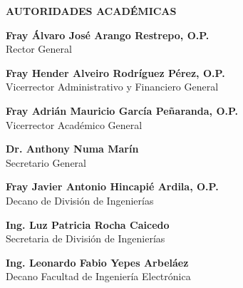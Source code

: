 \newpage
\clearpage
\thispagestyle{empty}

\begin{center}
	{\bfseries\MakeUppercase{AUTORIDADES ACADÉMICAS}}
\end{center}

\vspace{1.5cm} 

\begin{flushright}
	\textbf{Fray Álvaro José Arango Restrepo, O.P.}\\
	Rector General
	
	\vspace{1cm}
	
	\textbf{Fray Hender Alveiro Rodríguez Pérez, O.P.}\\
	Vicerrector Administrativo y Financiero General
	
	\vspace{1cm}
	
	\textbf{Fray Adrián Mauricio García Peñaranda, O.P.}\\
	Vicerrector Académico General
	
	\vspace{1cm}
	
	\textbf{Dr. Anthony Numa Marín}\\
	Secretario General
	
	\vspace{1cm}
	
	\textbf{Fray Javier Antonio Hincapié Ardila, O.P.}\\
	Decano de División de Ingenierías
	
	\vspace{1cm}
	
	\textbf{Ing. Luz Patricia Rocha Caicedo}\\
	Secretaria de División de Ingenierías
	
	\vspace{1cm}
	
	\textbf{Ing. Leonardo Fabio Yepes Arbeláez}\\
	Decano Facultad de Ingeniería Electrónica
\end{flushright}

\vfill

\clearpage